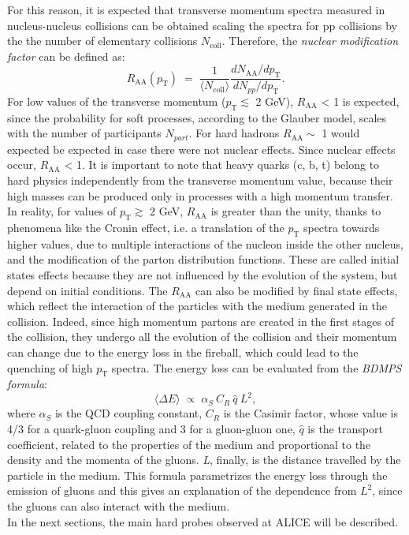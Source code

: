 For this reason, it is expected that transverse momentum spectra measured in nucleus-nucleus collisions can be obtained scaling the spectra for pp collisions by the the number of elementary collisions $N_{\mathrm{coll}}$.
Therefore, the \textit{nuclear modification factor}  can be defined as:
\begin{equation}
 R_{\mathrm{AA}}(p_{\mathrm{T}})\;=\;\frac{1}{\langle N_{\mathrm{coll}}\rangle}\frac{dN_{\mathrm{AA}}/dp_{\mathrm{T}}}{dN_{pp}/dp_{\mathrm{T}}}.
\end{equation}
For low values of the transverse momentum ($p_{\mathrm{T}} \lesssim$ 2 GeV), $R_{\mathrm{AA}}$ < 1 is expected, since the probability for soft processes, according to the Glauber model, scales with the number of participants $N_{part}$. For hard hadrons $R_{\mathrm{AA}} \sim$ 1 would expected be expected in case there were not nuclear effects. Since nuclear effects occur, $R_{\mathrm{AA}}$ < 1. It is important to note that heavy quarks (c, b, t) belong to hard physics independently from the transverse momentum value, because their high masses can be produced only in processes with a high momentum transfer. In reality, for values of $p_{\mathrm{T}} \gtrsim$ 2 GeV,  $R_{\mathrm{AA}}$ is greater than the unity, thanks to phenomena like the Cronin effect, i.e. a translation of the $p_{\mathrm{T}}$ spectra towards higher values, due to multiple interactions of the nucleon inside the other nucleus, and the modification of the parton distribution functions. These are called initial states effects because they are not influenced by the evolution of the system, but depend on initial conditions. The $R_{\mathrm{AA}}$ can also be modified by final state effects, which reflect the interaction of the particles with the medium generated in the collision. Indeed, since high momentum partons are created in the first stages of the collision, they undergo all the evolution of the collision and their momentum can change due to the energy loss in the fireball, which could lead to the quenching of high $p_{\mathrm{T}}$ spectra. The energy loss can be evaluated from the \textit{BDMPS formula}\cite{RAA}:
\begin{equation}
 \langle \Delta E \rangle \;\propto\;\alpha_{S} \:C_{R}\: \hat{q}\: L^{2},
\end{equation}
where $\alpha_{S}$ is the QCD coupling constant, $C_{R}$ is the Casimir factor, whose value is 4/3 for a quark-gluon coupling and 3 for a gluon-gluon 
one, $\hat{q}$ is the transport coefficient, related to the properties of the medium and proportional to the density and the momenta of the gluons. \textit{L}, finally, is the distance travelled by the particle in the medium. This formula parametrizes the energy loss through the emission of gluons and this gives an explanation of the dependence from $L^{2}$, since the gluons can also interact with the medium.\\
In the next sections, the main hard probes observed at ALICE will be described.
%
